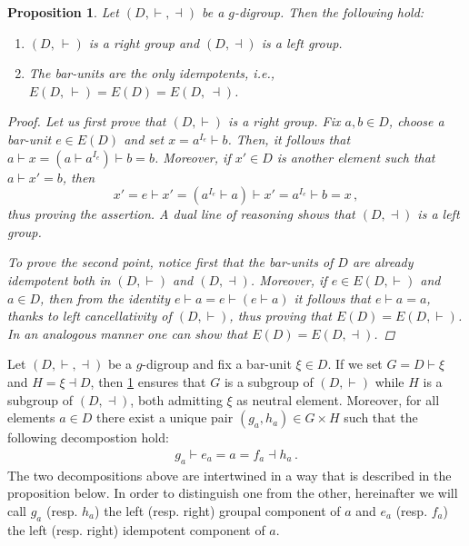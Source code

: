 \documentclass[preprint,1p]{elsarticle}
\numberwithin{equation}{section}
\newtheorem{prop}[theor]{Proposition}
\theoremstyle{definition}               %
\newcommand{\vd}{\vdash}
\newcommand{\dv}{\dashv}
\begin{document}
\begin{prop}\label{g-digroup_decomp}
    Let $(D,\vd,\dv)$ be a $g$-digroup.
    Then the following hold:
    \begin{enumerate}
        \item[1)] $(D,\,\vd)$ is a right group and $(D,\dv)$ is a left group.
        \item[2)] The bar-units are the only idempotents, i.e.,
        $E(D,\,\vd) = E(D) = E(D,\,\dv)$.
    \end{enumerate}
    \begin{proof}
        Let us first prove that $(D,\vd)$ is a right group.
        Fix $a,b \in D$, choose a bar-unit $e \in E(D)$ and set $x = a^{I_e} \vd b$.
        Then, it follows that $a \vd x = (a \vd a^{I_e}) \vd b = b$.
        Moreover, if $x' \in D$ is another element such that $a \vd x' = b$, then
        \[
            x' = e \vd x' = (a^{I_e} \vd a) \vd x' = a^{I_e} \vd b = x \,,
        \]
        thus proving the assertion.
        A dual line of reasoning shows that $(D,\dv)$ is a left group.

        To prove the second point, notice first that the bar-units of $D$ are already idempotent both in $(D,\vd)$ and $(D,\dv)$.
        Moreover, if $e \in E(D,\vd)$ and $a \in D$, then from the identity ${e \vd a = e \vd (e \vd a)}$ it follows that $e \vd a = a$, thanks to left cancellativity of $(D,\vd)$, thus proving that $E(D) = E(D,\vd)$.
        In an analogous manner one can show that ${E(D) = E(D,\dv)}$.
    \end{proof}
\end{prop}

Let $(D,\vd,\dv)$ be a $g$-digroup and fix a bar-unit $\xi \in D$.
If we set $G = D \vd \xi$ and $H = \xi \dv D$, then \cref{g-digroup_decomp} ensures that $G$ is a subgroup of $(D,\vd)$ while $H$ is a subgroup of $(D,\dv)$, both admitting $\xi$ as neutral element.
Moreover, for all elements $a \in D$ there exist  a unique pair $(g_a,h_a) \in G \times H$ such that the following decompostion hold:
\begin{align*}
    g_a \vd e_a = a = f_a \dv h_a \,.
\end{align*}
The two decompositions above are intertwined in a way that is described in the proposition below.
In order to distinguish one from the other, hereinafter we will call $g_a$ (resp. $h_a$) the left (resp. right) groupal component of $a$ and $e_a$ (resp. $f_a$) the left (resp. right) idempotent component of $a$.
\end{document}
